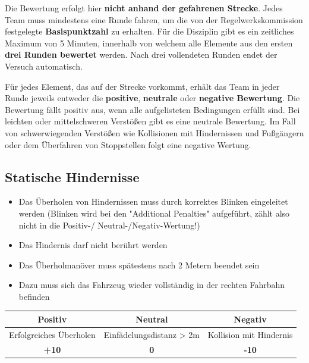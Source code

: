 \documentclass[a4paper, 11pt,usegeometry]{scrartcl}
\begin{document}
Die Bewertung erfolgt hier \textbf{nicht anhand der gefahrenen Strecke}. Jedes Team muss mindestens eine Runde fahren, um die von der Regelwerkskommission festgelegte \textbf{Basispunktzahl} zu
erhalten. Für die Disziplin gibt es ein zeitliches Maximum von 5 Minuten, innerhalb von welchem alle Elemente aus den ersten \textbf{drei Runden bewertet} werden. Nach drei vollendeten Runden endet der Versuch automatisch.

Für jedes Element, das auf der Strecke vorkommt, erhält das Team in jeder Runde jeweils entweder die \textbf{positive}, \textbf{neutrale} oder \textbf{negative Bewertung}.
Die Bewertung fällt positiv aus, wenn alle aufgelisteten Bedingungen erfüllt sind.
Bei leichten oder mittelschweren Verstößen gibt es eine neutrale Bewertung.
Im Fall von schwerwiegenden Verstößen wie Kollisionen mit Hindernissen und Fußgängern oder 
dem Überfahren von Stoppstellen folgt eine negative Wertung.

\subsection*{Statische Hindernisse}
\begin{itemize}
  \item Das Überholen von Hindernissen muss durch korrektes Blinken eingeleitet werden
(Blinken wird bei den "Additional Penalties" aufgeführt, zählt also nicht in die Positiv-/
Neutral-/Negativ-Wertung!)
  \item Das Hindernis darf nicht berührt werden
  \item Das Überholmanöver muss spätestens nach 2 Metern beendet sein
  \item Dazu muss sich das Fahrzeug wieder vollständig in der rechten Fahrbahn befinden
\end{itemize}
\begin{table}[H]
\begin{tabular}{|c|c|c|}
\hline
\rowcolor[HTML]{CACACA} 
\textbf{Positiv} & \textbf{Neutral} & \textbf{Negativ} \\ \hline
Erfolgreiches Überholen & Einfädelungsdistanz > 2m & Kollision mit Hindernis \\ \hline
\textbf{+10} & \textbf{0} & \textbf{-10} \\ \hline
\end{tabular}
\end{table}
\end{document}
